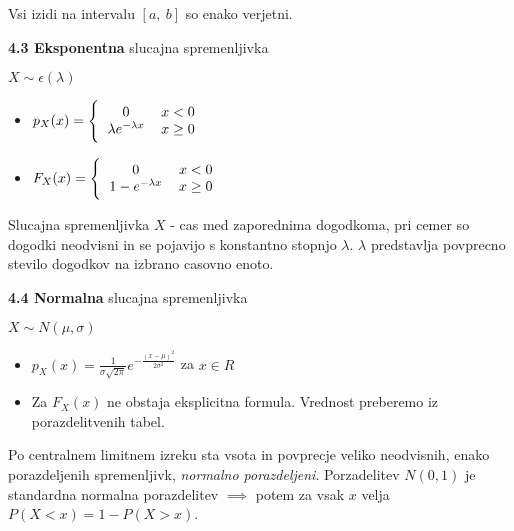 \documentclass{article}
\begin{document}
\begin{multicols}{2}
	Vsi izidi na intervalu $[a,\: b]$ so enako verjetni.

	\textbf{4.3 Eksponentna} slucajna spremenljivka
	\begin{center}
		\begin{math}
			X \sim \epsilon(\lambda)
		\end{math}
	\end{center}

	\begin{itemize}
		\item  \begin{math}
			      p_{X}(x) =
			      \Bigg \{\begin{tabular}{ccc}
				      $0$                       & $x < 0$    & \\
				      $\lambda e^{- \lambda x}$ & $x \geq 0$ & \\
			      \end{tabular}
		      \end{math}

		\item \begin{math}
			      F_{X}(x) =
			      \Bigg \{\begin{tabular}{ccc}
				      $0$                   & $x < 0$    & \\
				      $1 - e^{- \lambda x}$ & $x \geq 0$ & \\
			      \end{tabular}
		      \end{math}
	\end{itemize}

	Slucajna spremenljivka $X$ - cas med zaporednima dogodkoma,
	pri cemer so dogodki neodvisni in se pojavijo s konstantno
	stopnjo $\lambda$. $\lambda$ predstavlja povprecno stevilo dogodkov
	na izbrano casovno enoto.

	\textbf{4.4 Normalna} slucajna spremenljivka
	\begin{center}
		\begin{math}
			X \sim N(\mu, \sigma )
		\end{math}
	\end{center}

	\begin{itemize}
		\item  \begin{math}
			      p_{X}(x) = \frac{1}{\sigma \sqrt{2 \pi}} e^{- \frac{(x - \mu)^{2}}{2 \sigma^{2}}}
		      \end{math} za $x \in R$

		\item Za $F_{X}(x)$ ne obstaja eksplicitna formula. Vrednost preberemo iz porazdelitvenih tabel.
	\end{itemize}
	Po centralnem limitnem izreku sta vsota in povprecje veliko neodvisnih, enako porazdeljenih
	spremenljivk, \textit{normalno porazdeljeni}.
	Porzadelitev $N(0, 1)$ je standardna normalna porazdelitev $\implies$ potem za vsak $x$ velja
	\begin{math}
		P(X < x) = 1 - P(X > x)
	\end{math}.


\end{multicols}
\end{document}
